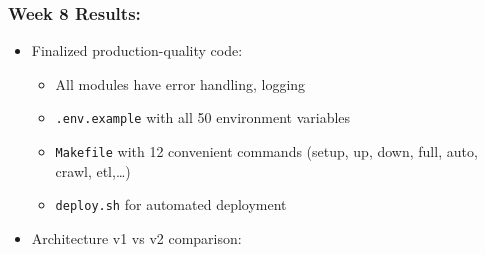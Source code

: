 \hypertarget{week-8-results}{%
\subsubsection{Week 8 Results:}}

\begin{itemize}
\item
  Finalized production-quality code:

  \begin{itemize}
  \tightlist
  \item
    All modules have error handling, logging
  \item
    \texttt{.env.example} with all 50 environment variables
  \item
    \texttt{Makefile} with 12 convenient commands (setup, up, down,
    full, auto, crawl, etl,\ldots)
  \item
    \texttt{deploy.sh} for automated deployment
  \end{itemize}
\item
  Architecture v1 vs v2 comparison:


\end{itemize}
